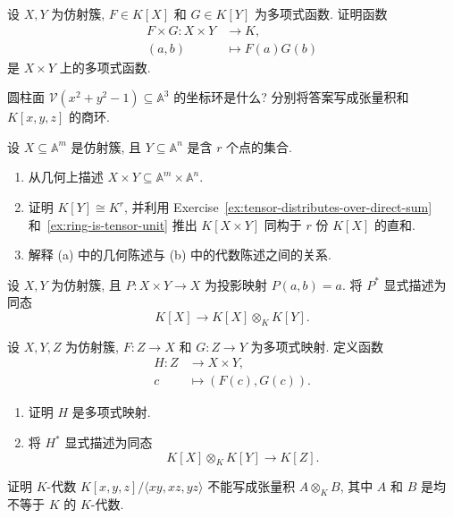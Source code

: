 \BookExerciseHeading
\begin{BookExercises}
  \item\label{ex:product-of-polynomial-functions-is-polynomial} 设 $X,Y$ 为仿射簇, $F\in K[X]$ 和 $G\in K[Y]$ 为多项式函数. 证明函数
  \[
    \begin{aligned}
      F\times G:X\times Y&\to K,\\
      (a,b)&\mapsto F(a)G(b)
    \end{aligned}
  \]
  是 $X\times Y$ 上的多项式函数.
  \item\label{ex:coordinate-ring-of-cylinder} 圆柱面 $\mathcal{V}(x^{2}+y^{2}-1)\subseteq\mathbb{A}^{3}$ 的坐标环是什么? 分别将答案写成张量积和 $K[x,y,z]$ 的商环.
  \item\label{ex:coordinate-ring-of-product-with-finite-set} 设 $X\subseteq\mathbb{A}^{m}$ 是仿射簇, 且 $Y\subseteq\mathbb{A}^{n}$ 是含 $r$ 个点的集合.
  \begin{enumerate}
    \item 从几何上描述 $X\times Y\subseteq\mathbb{A}^{m}\times\mathbb{A}^{n}$.
    \item 证明 $K[Y]\cong K^{r}$, 并利用 Exercise~\ref{ex:tensor-distributes-over-direct-sum} 和~\ref{ex:ring-is-tensor-unit} 推出 $K[X\times Y]$ 同构于 $r$ 份 $K[X]$ 的直和.
    \item 解释 (a) 中的几何陈述与 (b) 中的代数陈述之间的关系.
  \end{enumerate}
  \item\label{ex:pullback-of-product-projection} 设 $X,Y$ 为仿射簇, 且 $P:X\times Y\to X$ 为投影映射 $P(a,b)=a$. 将 $P^{*}$ 显式描述为同态
  \[
    K[X]\to K[X]\otimes_{K}K[Y].
  \]
  \item\label{ex:pullback-of-pair-of-polynomial-maps} 设 $X,Y,Z$ 为仿射簇, $F:Z\to X$ 和 $G:Z\to Y$ 为多项式映射. 定义函数
  \[
    \begin{aligned}
      H:Z&\to X\times Y,\\
      c&\mapsto(F(c),G(c)).
    \end{aligned}
  \]
  \begin{enumerate}
    \item 证明 $H$ 是多项式映射.
    \item 将 $H^{*}$ 显式描述为同态
    \[
      K[X]\otimes_{K}K[Y]\to K[Z].
    \]
  \end{enumerate}
  \item\label{ex:three-axes-coordinate-ring-not-nontrivial-tensor} 证明 $K$-代数 $K[x,y,z]/\langle xy,xz,yz\rangle$ 不能写成张量积 $A\otimes_{K}B$, 其中 $A$ 和 $B$ 是均不等于 $K$ 的 $K$-代数.

\end{BookExercises}
